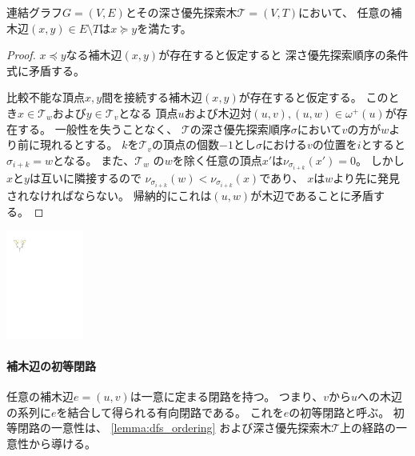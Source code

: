 \begin{lemma}
\label{lemma:dfs_ordering}
連結グラフ$G=(V, E)$とその深さ優先探索木${\mathcal T}=(V, T)$において、
任意の補木辺$(x, y) \in E \setminus T$は$x\succeq y$を満たす。
\end{lemma}


\begin{paracol}{2}
\begin{proof}
$x \preceq y$なる補木辺$(x, y)$が存在すると仮定すると
深さ優先探索順序の条件式に矛盾する。

比較不能な頂点$x,y$間を接続する補木辺$(x,y)$が存在すると仮定する。
このとき$x\in {\mathcal T}_w$および$y \in {\mathcal T}_v$となる
頂点$u$および木辺対$(u, v), (u, w) \in \omega^+(u)$が存在する。
一般性を失うことなく、
${\mathcal T}$の深さ優先探索順序$\sigma$において$v$の方が$w$より前に現れるとする。
$k$を${\mathcal T}_v$の頂点の個数$-1$とし$\sigma$における$v$の位置を$i$とすると
$\sigma_{i+k}=w$となる。
また、${\mathcal T}_w$ の$w$を除く任意の頂点$x'$は$\nu_{\sigma_{i+k}}(x') = 0$。
しかし$x$と$y$は互いに隣接するので
$\nu_{\sigma_{i+k}}(w) < \nu_{\sigma_{i+k}}(x)$であり、
$x$は$w$より先に発見されなければならない。
帰納的にこれは$(u, w)$が木辺であることに矛盾する。
\end{proof}

\switchcolumn
\vspace{1.\intextsep}
\centering
\includegraphics[width=0.19\textwidth]{figures/dfs_ordering2.pdf}
\end{paracol}


\paragraph{補木辺の初等閉路}
任意の補木辺$e=(u, v)$は一意に定まる閉路を持つ。
つまり、$v$から$u$への木辺の系列に$e$を結合して得られる有向閉路である。
これを$e$の初等閉路と呼ぶ。
初等閉路の一意性は、
\cref{lemma:dfs_ordering}%
および深さ優先探索木${\mathcal T}$上の経路の一意性から導ける。



